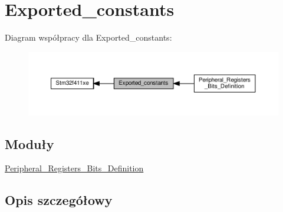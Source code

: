 \hypertarget{group___exported__constants}{}\section{Exported\+\_\+constants}
\label{group___exported__constants}
Diagram współpracy dla Exported\+\_\+constants\+:\nopagebreak
\begin{figure}[H]
\begin{center}
\leavevmode
\includegraphics[width=350pt]{group___exported__constants}
\end{center}
\end{figure}
\subsection*{Moduły}
\begin{DoxyCompactItemize}
\item 
\hyperlink{group___peripheral___registers___bits___definition}{Peripheral\+\_\+\+Registers\+\_\+\+Bits\+\_\+\+Definition}
\end{DoxyCompactItemize}


\subsection{Opis szczegółowy}
